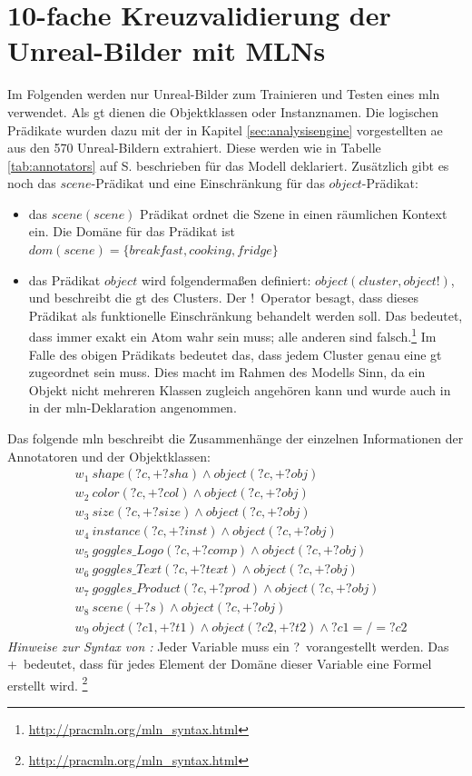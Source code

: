 \section{10-fache Kreuzvalidierung der Unreal-Bilder mit MLNs}
\label{sec:onlyUnrealImages}
Im Folgenden werden nur Unreal-Bilder zum Trainieren und Testen eines \gls{mln} verwendet. Als \gls{gt} dienen die Objektklassen oder Instanznamen. Die logischen Prädikate wurden dazu mit der in Kapitel \ref{sec:analysisengine} vorgestellten \gls{ae} aus den 570 Unreal-Bildern extrahiert. Diese werden wie in Tabelle \ref{tab:annotators} auf S.\pageref{tab:annotators} beschrieben für das Modell deklariert.  Zusätzlich gibt es noch das $scene$-Prädikat und eine Einschränkung für das $object$-Prädikat:
\begin{itemize}
\item das $scene(scene)$ Prädikat ordnet die Szene in einen räumlichen Kontext ein. Die Domäne für das Prädikat ist $dom(scene) = \{breakfast, cooking, fridge\}$
\item das Prädikat $object$ wird folgendermaßen definiert: $object(cluster, object!)$, und beschreibt die \gls{gt} des Clusters. Der \glqq!\grqq \ Operator besagt, dass dieses Prädikat als funktionelle Einschränkung behandelt werden soll. Das bedeutet, dass immer exakt ein Atom wahr sein muss; alle anderen sind falsch.\footnote{\url{http://pracmln.org/mln_syntax.html}} Im Falle des obigen Prädikats bedeutet das, dass jedem Cluster genau eine \gls{gt} zugeordnet sein muss. Dies macht im Rahmen des Modells Sinn, da ein Objekt nicht mehreren Klassen zugleich angehören kann und wurde auch in \cite{pr2looking} in der \gls{mln}-Deklaration angenommen.
\end{itemize}
Das folgende \gls{mln} beschreibt die Zusammenhänge der einzelnen Informationen der Annotatoren und der Objektklassen:
\begin{align*}
& w_{1} \ shape(?c, +?sha) \wedge object(?c, +?obj) \\
& w_{2} \ color(?c, +?col) \wedge object(?c, +?obj) \\
& w_{3} \ size(?c, +?size) \wedge object(?c, +?obj) \\
& w_{4} \ instance(?c, +?inst) \wedge object(?c, +?obj) \\
& w_{5} \ goggles\_Logo(?c, +?comp) \wedge object(?c, +?obj)\\
& w_{6} \ goggles\_Text(?c, +?text) \wedge object(?c, +?obj)\\
& w_{7} \ goggles\_Product(?c, +?prod) \wedge object(?c, +?obj)\\
& w_{8} \ scene(+?s) \wedge object(?c, +?obj)\\
& w_{9} \ object(?c1, +?t1) \wedge object(?c2, +?t2) \wedge ?c1 =/= ?c2
\end{align*}
\textit{Hinweise zur Syntax von \pracmln:} Jeder Variable muss ein \glqq ?\grqq \ vorangestellt werden. Das \glqq +\grqq \ bedeutet, dass für jedes Element der Domäne dieser Variable eine Formel erstellt wird. \footnote{\url{http://pracmln.org/mln_syntax.html}}  \par
 
